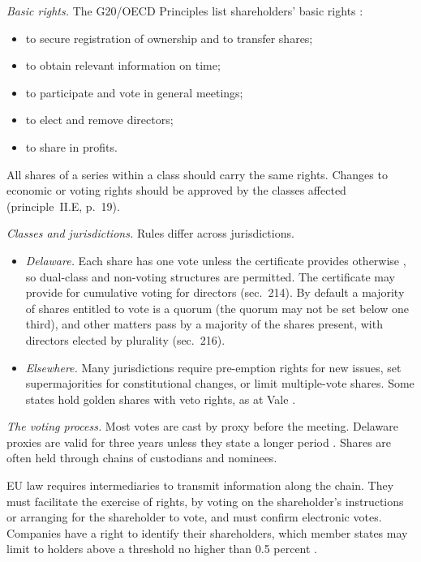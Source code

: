 \begin{qfdefinition}\label{def:equity-rights-voting}
 \emph{Basic rights.} The G20/OECD Principles list shareholders' basic rights \citep[principle~II.A, p.~15]{oecd-g20-principles-2023}:
\begin{itemize}
\item to secure registration of ownership and to transfer shares;
\item to obtain relevant information on time;
\item to participate and vote in general meetings;
\item to elect and remove directors;
\item to share in profits.
\end{itemize}
All shares of a series within a class should carry the same rights. Changes to economic or voting rights should be approved by the classes affected (principle~II.E, p.~19).

\emph{Classes and jurisdictions.} Rules differ across jurisdictions.
\begin{itemize}
\item \emph{Delaware.} Each share has one vote unless the certificate provides otherwise \citep[sec.~212(a)]{delaware-gcl-2026}, so dual-class and non-voting structures are permitted. The certificate may provide for cumulative voting for directors (sec.~214). By default a majority of shares entitled to vote is a quorum (the quorum may not be set below one third), and other matters pass by a majority of the shares present, with directors elected by plurality (sec.~216).
\item \emph{Elsewhere.} Many jurisdictions require pre-emption rights for new issues, set supermajorities for constitutional changes, or limit multiple-vote shares. Some states hold golden shares with veto rights, as at Vale \citep[p.~23]{applied-corporate-finance-2014}.
\end{itemize}

\emph{The voting process.} Most votes are cast by proxy before the meeting. Delaware proxies are valid for three years unless they state a longer period \citep[sec.~212(b)]{delaware-gcl-2026}. Shares are often held through chains of custodians and nominees.

EU law requires intermediaries to transmit information along the chain. They must facilitate the exercise of rights, by voting on the shareholder's instructions or arranging for the shareholder to vote, and must confirm electronic votes. Companies have a right to identify their shareholders, which member states may limit to holders above a threshold no higher than 0.5 percent \citep[Arts.~3a--3c of Directive 2007/36/EC as inserted]{eu-2017-828-srd2}.


\end{qfdefinition}
